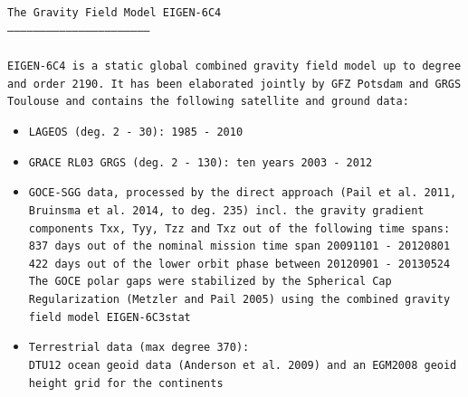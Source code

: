 \documentclass[a4paper, 12pt]{book}
\begin{document}
\noindent\texttt{The Gravity Field Model EIGEN-6C4\\
\noindent -----------------------------------------------------------------\\
\\
\noindent EIGEN-6C4 is a static global combined gravity field model up to 
degree and order 2190.  It has been elaborated jointly  by GFZ Potsdam and GRGS 
Toulouse and contains the following  satellite and ground data:\\
}
\begin{itemize}[leftmargin=*,noitemsep,topsep=0pt]
\renewcommand\labelitemi{\texttt{-}}
\item \texttt{LAGEOS (deg. 2 - 30): 1985 - 2010
\\}

\item \texttt{GRACE RL03 GRGS (deg. 2 - 130): ten years 2003 - 2012\\}

\item \texttt{GOCE-SGG data, processed by the direct approach (Pail et 
al. 2011, Bruinsma et al. 2014, to deg. 235) incl. the gravity gradient 
components Txx, Tyy, Tzz and Txz out of the following time spans: 837 days out 
of the nominal mission time span 20091101 - 20120801 422 days out of the lower 
orbit phase between 20120901 - 20130524 The GOCE polar gaps were stabilized by 
the Spherical Cap Regularization (Metzler and Pail 2005) using the combined 
gravity field model EIGEN-6C3stat\\}

\item \texttt{Terrestrial data (max degree 370):
\\
DTU12 ocean geoid data (Anderson et al. 2009) and an EGM2008 geoid height grid 
for the continents}
\end{itemize}
\end{document}

